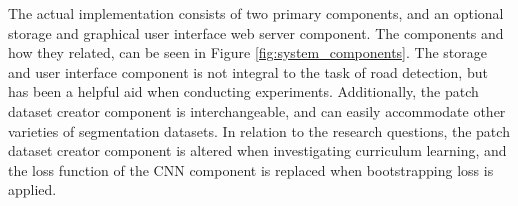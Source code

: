 The actual implementation consists of two primary components, and an optional storage and graphical user interface web server component. The components and how they related, can be seen in Figure \ref{fig:system_components}. The storage and user interface component is not integral to the task of road detection, but has been a helpful aid when conducting experiments. Additionally, the patch dataset creator component is interchangeable, and can easily accommodate other varieties of segmentation datasets. In relation to the research questions, the patch dataset creator component is altered when investigating curriculum learning, and the loss function of the \ac{CNN} component is replaced when bootstrapping loss is applied. \\


